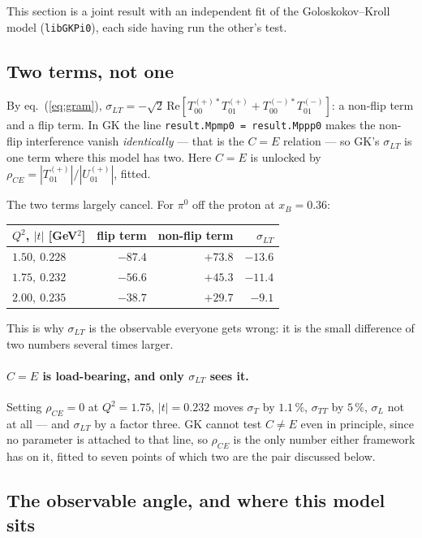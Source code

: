 \documentclass[11pt,a4paper]{article}
\newcommand{\sig}[1]{\sigma_{#1}}
\begin{document}
This section is a joint result with an independent fit of the
Goloskokov--Kroll model (\texttt{libGKPi0}), each side having run the other's
test.

\subsection{Two terms, not one}

By eq.~(\ref{eq:gram}), $\sig{LT} = -\sqrt2\,\mathrm{Re}
\left[T_{00}^{(+)*}T_{01}^{(+)} + T_{00}^{(-)*}T_{01}^{(-)}\right]$: a
non-flip term and a flip term.  In GK the line
\texttt{result.Mpmp0 = result.Mppp0} makes the non-flip interference vanish
\emph{identically} --- that is the $C = E$ relation --- so GK's $\sig{LT}$ is
one term where this model has two.  Here $C = E$ is unlocked by
$\rho_{CE} = |T_{01}^{(+)}|/|U_{01}^{(+)}|$, fitted.

The two terms largely cancel.  For $\pi^0$ off the proton at $x_B = 0.36$:

\begin{center}
\begin{tabular}{lrrr}
\toprule
$Q^2$, $|t|$ [GeV$^2$] & flip term & non-flip term & $\sig{LT}$\\
\midrule
$1.50,\ 0.228$ & $-87.4$ & $+73.8$ & $-13.6$\\
$1.75,\ 0.232$ & $-56.6$ & $+45.3$ & $-11.4$\\
$2.00,\ 0.235$ & $-38.7$ & $+29.7$ & $-9.1$\\
\bottomrule
\end{tabular}
\end{center}

\noindent
This is why $\sig{LT}$ is the observable everyone gets wrong: it is the small
difference of two numbers several times larger.

\paragraph{$C = E$ is load-bearing, and only $\sig{LT}$ sees it.}  Setting
$\rho_{CE} = 0$ at $Q^2 = 1.75$, $|t| = 0.232$ moves $\sig{T}$ by $1.1\,\%$,
$\sig{TT}$ by $5\,\%$, $\sig{L}$ not at all --- and $\sig{LT}$ by a factor
three.  GK cannot test $C \ne E$ even in principle, since no parameter is
attached to that line, so $\rho_{CE}$ is the only number either framework has
on it, fitted to seven points of which two are the pair discussed below.

\subsection{The observable angle, and where this model sits}
\end{document}
